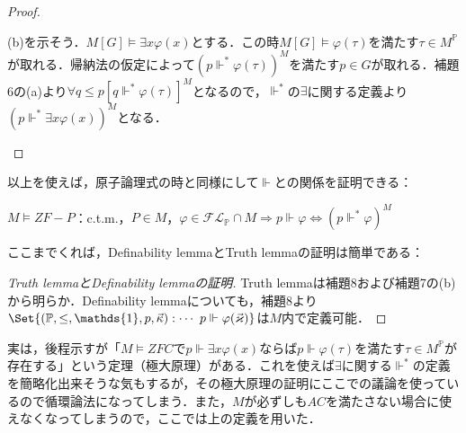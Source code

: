 \documentclass[a4j]{ltjsarticle}
\theoremstyle{definition}
\begin{document}
\begin{proof}
\begin{description}[style=nextline,font=\underline]
 (b)を示そう．$M[G] \models \exists x \varphi(x)$とする．この時$M[G] \models \varphi(\tau)$を満たす$\tau \in M^\mathbb{P}$が取れる．帰納法の仮定によって$(p \mathrel{\Vdash^*} \varphi(\tau))^M$を満たす$p \in G$が取れる．補題6の(a)より$\forall q \leq p [q \mathrel{\Vdash^*} \varphi(\tau)]^M$となるので，$\mathrel{\Vdash^*}$の$\exists$に関する定義より$(p \mathrel{\Vdash^*} \exists x \varphi(x))^M$となる．
\end{description}\mbox{}
\end{proof}

以上を使えば，原子論理式の時と同様にして$\Vdash$との関係を証明できる：

\begin{lemma}\label{forces:relativization}
 $M \models ZF-P$：c.t.m.，$P \in M$，$\varphi \in \mathcal{FL}_\mathbb{P} \cap M \Longrightarrow p \Vdash \varphi \Leftrightarrow (p \mathrel{\Vdash^*} \varphi)^M$
\end{lemma}

ここまでくれば，Definability lemmaとTruth lemmaの証明は簡単である：

\begin{proof}[Truth lemmaとDefinability lemmaの証明]
 Truth lemmaは補題8および補題7の(b)から明らか．Definability lemmaについても，補題8より$\Set{(\mathbb{P}, \leq, \mathds{1}, p, \vec{\kappa}) : \cdots \ p \Vdash \varphi(\vec{\varkappa})}$は$M$内で定義可能．\mbox{}
\end{proof}

実は，後程示すが「$M \models ZFC$で$p \Vdash \exists x \varphi(x)$ならば$p \Vdash \varphi(\tau)$を満たす$\tau \in M^\mathbb{P}$が存在する」という定理（極大原理）がある．これを使えば$\exists$に関する$\mathrel{\Vdash^*}$の定義を簡略化出来そうな気もするが，その極大原理の証明にここでの議論を使っているので循環論法になってしまう．また，$M$が必ずしも$AC$を満たさない場合に使えなくなってしまうので，ここでは上の定義を用いた．

\nocite{Kunen:2011,Arai:2011,Tanaka:2007}
\printbibliography[title=参考文献]
\end{document}

